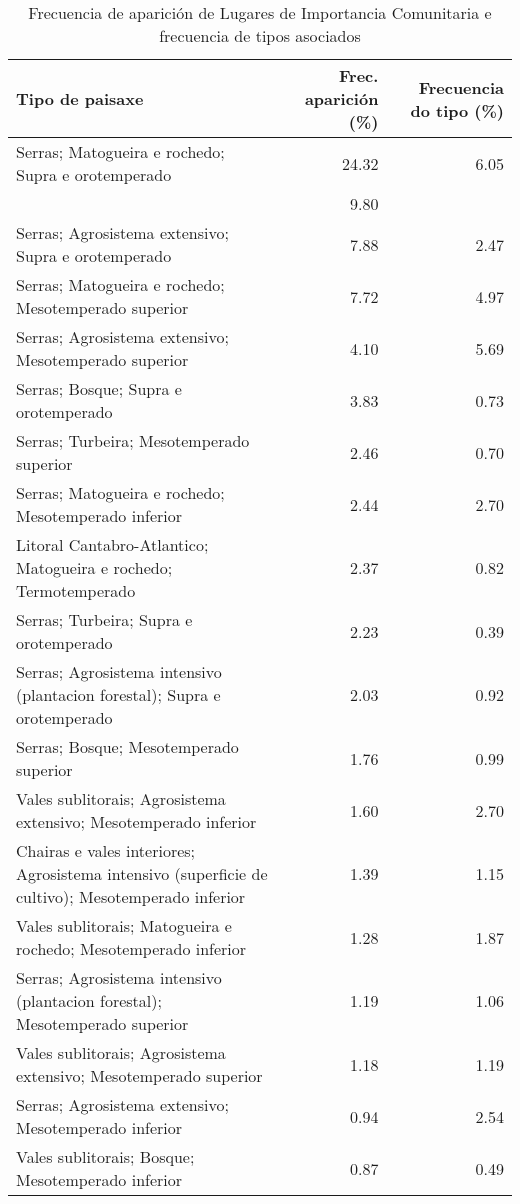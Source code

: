 \begin{table}[p]
\centering
\caption{Frecuencia de aparición de Lugares de Importancia Comunitaria e frecuencia de tipos asociados} 
\label{vnatura}
\begin{tabular}{lrr}
  \hline
Tipo de paisaxe & Frec. aparición (\%) & Frecuencia do tipo (\%) \\ 
  \hline
Serras; Matogueira e rochedo; Supra e orotemperado & 24.32 & 6.05 \\ 
   & 9.80 &  \\ 
  Serras; Agrosistema extensivo; Supra e orotemperado & 7.88 & 2.47 \\ 
  Serras; Matogueira e rochedo; Mesotemperado superior & 7.72 & 4.97 \\ 
  Serras; Agrosistema extensivo; Mesotemperado superior & 4.10 & 5.69 \\ 
  Serras; Bosque; Supra e orotemperado & 3.83 & 0.73 \\ 
  Serras; Turbeira; Mesotemperado superior & 2.46 & 0.70 \\ 
  Serras; Matogueira e rochedo; Mesotemperado inferior & 2.44 & 2.70 \\ 
  Litoral Cantabro-Atlantico; Matogueira e rochedo; Termotemperado & 2.37 & 0.82 \\ 
  Serras; Turbeira; Supra e orotemperado & 2.23 & 0.39 \\ 
  Serras; Agrosistema intensivo (plantacion forestal); Supra e orotemperado & 2.03 & 0.92 \\ 
  Serras; Bosque; Mesotemperado superior & 1.76 & 0.99 \\ 
  Vales sublitorais; Agrosistema extensivo; Mesotemperado inferior & 1.60 & 2.70 \\ 
  Chairas e vales interiores; Agrosistema intensivo (superficie de cultivo); Mesotemperado inferior & 1.39 & 1.15 \\ 
  Vales sublitorais; Matogueira e rochedo; Mesotemperado inferior & 1.28 & 1.87 \\ 
  Serras; Agrosistema intensivo (plantacion forestal); Mesotemperado superior & 1.19 & 1.06 \\ 
  Vales sublitorais; Agrosistema extensivo; Mesotemperado superior & 1.18 & 1.19 \\ 
  Serras; Agrosistema extensivo; Mesotemperado inferior & 0.94 & 2.54 \\ 
  Vales sublitorais; Bosque; Mesotemperado inferior & 0.87 & 0.49 \\ 

\end{tabular}
\end{table}
